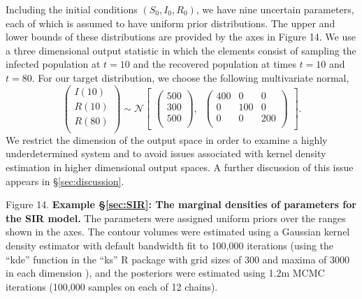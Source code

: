 \documentclass[10pt,letterpaper]{article}
\begin{document}
Including the initial conditions $(S_0,I_0,R_0)$, we have nine uncertain parameters, each of which is assumed to have uniform prior distributions. The upper and lower bounds of these distributions are provided by the axes in Figure 14. We use a three dimensional output statistic in which the elements consist of sampling the infected population at $t=10$ and the recovered population at times $t=10$ and $t=80$. For our target distribution, we choose the following multivariate normal,
%
\begin{equation}\label{eq:sir_outputDistribution}
\begin{pmatrix}I(10)\\
R(10)\\
R(80)\\
\end{pmatrix} \sim  \mathcal{N}
\begin{bmatrix}
\begin{pmatrix}
500\\
300\\
500\\
\end{pmatrix}, \;\;
\begin{pmatrix}
400 & 0 & 0\\
0 & 100 & 0\\
0 & 0 & 200\\
\end{pmatrix}
\end{bmatrix}.
\end{equation}
%
We restrict the dimension of the output space in order to examine a highly underdetermined system and to avoid issues associated with kernel density estimation in higher dimensional output spaces. A further discussion of this issue appears in \S \ref{sec:discussion}.

\vspace{0.5cm}

Figure 14. {\bf Example \S \ref{sec:SIR}: The marginal densities of parameters for the SIR model.} The parameters were assigned uniform priors over the ranges shown in the axes. The contour volumes were estimated using a Gaussian kernel density estimator with default bandwidth fit to 100,000 iterations (using the ``kde'' function in the ``ks'' R \cite{RLanguage} package with grid sizes of 300 and maxima of 3000 in each dimension \cite{duong2018package}), and the posteriors were estimated using 1.2m MCMC iterations (100,000 samples on each of 12 chains).

\vspace{0.5cm}
\end{document}
